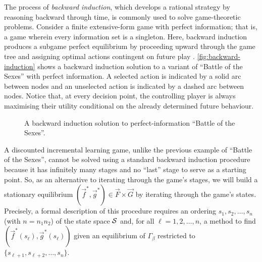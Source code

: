     The process of \emph{backward induction}, which develops a rational strategy by reasoning backward through time, is commonly used to solve game-theoretic problems.
    Consider a finite extensive-form game with perfect information; that is, a game wherein every information set is a singleton.
    Here, backward induction produces a subgame perfect equilibrium by proceeding upward through the game tree and assigning optimal actions contingent on future play \parencite{Osborne1994}.
    \autoref{fig:backward-induction} shows a backward induction solution to a variant of ``Battle of the Sexes'' with perfect information.
    A selected action is indicated by a solid arc between nodes and an unselected action is indicated by a dashed arc between nodes.
    Notice that, at every decision point, the controlling player is always maximising their utility conditional on the already determined future behaviour.

    \begin{figure}[t]
        \centering
        
        \caption[Backward Induction in ``Battle of the Sexes'']{A backward induction solution to perfect-information ``Battle of the Sexes''.}
        \label{fig:backward-induction}
    \end{figure}

    A discounted incremental learning game, unlike the previous example of ``Battle of the Sexes'', cannot be solved using a standard backward induction procedure because it has infinitely many stages and no ``last'' stage to serve as a starting point.
    So, as an alternative to iterating through the game's stages, we will build a stationary equilibrium $(\vec{f}^*, \vec{g}^*) \in \vec{F} \times \vec{G}$ by iterating through the game's states.
    Precisely, a formal description of this procedure requires an ordering $s_1, s_2, \ldots, s_n$ (with $n = n_1 n_2$) of the state space $\mathcal{S}$ and, for all $\ell = 1, 2, \ldots, n$, a method to find $(\vec{f}^*(s_\ell), \vec{g}^*(s_\ell))$ given an equilibrium of $\Gamma_\beta$ restricted to $\{s_{\ell + 1}, s_{\ell + 2}, \ldots, s_n\}$.

